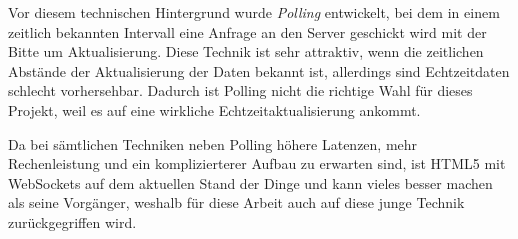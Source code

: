 Vor diesem technischen Hintergrund wurde \emph{Polling} entwickelt, bei dem in einem zeitlich bekannten Intervall eine Anfrage an den Server geschickt wird mit der Bitte um Aktualisierung. Diese Technik ist sehr attraktiv, wenn die zeitlichen Abstände der Aktualisierung der Daten bekannt ist, allerdings sind Echtzeitdaten schlecht vorhersehbar. Dadurch ist Polling nicht die richtige Wahl für dieses Projekt, weil es auf eine wirkliche Echtzeitaktualisierung ankommt.\par

Da bei sämtlichen Techniken neben Polling höhere Latenzen, mehr Rechenleistung und ein komplizierterer Aufbau zu erwarten sind, ist HTML5 mit WebSockets auf dem aktuellen Stand der Dinge und kann vieles besser machen als seine Vorgänger, weshalb für diese Arbeit auch auf diese junge Technik zurückgegriffen wird.